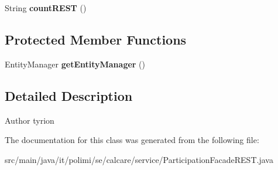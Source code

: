 \begin{DoxyCompactItemize}
\item 
\hypertarget{classit_1_1polimi_1_1se_1_1calcare_1_1service_1_1ParticipationFacadeREST_aec65de4398b2e968d8ba3b4ad40435bf}{}String {\bfseries count\+R\+E\+S\+T} ()\label{classit_1_1polimi_1_1se_1_1calcare_1_1service_1_1ParticipationFacadeREST_aec65de4398b2e968d8ba3b4ad40435bf}

\end{DoxyCompactItemize}
\subsection*{Protected Member Functions}
\begin{DoxyCompactItemize}
\item 
\hypertarget{classit_1_1polimi_1_1se_1_1calcare_1_1service_1_1ParticipationFacadeREST_a0b0b8947c01c77d3650f26524c450d18}{}Entity\+Manager {\bfseries get\+Entity\+Manager} ()\label{classit_1_1polimi_1_1se_1_1calcare_1_1service_1_1ParticipationFacadeREST_a0b0b8947c01c77d3650f26524c450d18}

\end{DoxyCompactItemize}


\subsection{Detailed Description}
\begin{DoxyAuthor}{Author}
tyrion 
\end{DoxyAuthor}


The documentation for this class was generated from the following file\+:\begin{DoxyCompactItemize}
\item 
src/main/java/it/polimi/se/calcare/service/Participation\+Facade\+R\+E\+S\+T.\+java\end{DoxyCompactItemize}
